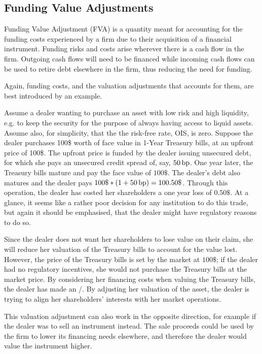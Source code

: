 \documentclass[main.tex]{subfiles}
\begin{document}
    \subsection{Funding Value Adjustments}
        Funding Value Adjustment (FVA) is a quantity meant for accounting for the funding costs 
        experienced by a firm due to their acquisition of a financial instrument.
        Funding risks and costs arise wherever there is a cash flow in the firm. 
        Outgoing cash flows will need to be financed while incoming cash flows
        can be used to retire debt elsewhere in the firm, thus reducing the need for funding.

        Again, funding costs, and the valuation adjustments that accounts for them,
        are best introduced by an example.

        \begin{example}
        Assume a dealer wanting to purchase an asset with low risk and high liquidity, 
        e.g. to keep the security for the purpose of always having access to liquid assets.
        Assume also, for simplicity, that the the risk-free rate, OIS, is zero.
        Suppose the dealer purchases 100\$ worth of face value in 1-Year Treasury bills,
        at an upfront price of 100\$. 
        The upfront price is funded by the dealer issuing unsecured debt, 
        for which she pays an unsecured credit spread of, say, $50\,\text{bp}$.
        One year later, the Treasury bills mature and pay the face value of $100\$$.
        The dealer's debt also matures and the dealer pays $100\$ * (1 + 50\basispoint) = 100.50\$$.
        Through this operation, the dealer has costed her shareholders a one year loss of $0.50\$$.
        At a glance, it seems like a rather poor decision for any institution to do this trade,
        but again it should be emphasised, that the dealer might have regulatory reasons to do so.

        Since the dealer does not want her shareholders to lose value on their claim,
        she will reduce her valuation of the Treasury bills to account for the value lost.
        However, the price of the Treasury bills is set by the market at $100\$$;
        if the dealer had no regulatory incentives, 
        she would not purchase the Treasury bills at the market price. 
        By considering her financing costs when valuing the Treasury bills, 
        the dealer has made an \FVA/.
        By adjusting her valuation of the asset, 
        the dealer is trying to align her shareholders' interests with her market operations.
        
        This valuation adjustment can also work in the opposite direction, 
        for example if the dealer was to sell an instrument instead.
        The sale proceeds could be used by the firm to lower its financing needs elsewhere,
        and therefore the dealer would value the instrument higher. 
        \end{example}
        
\end{document}
